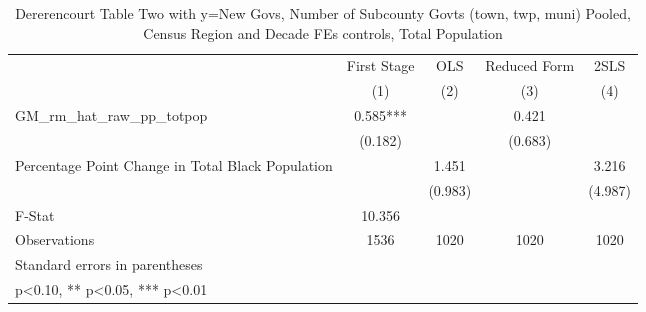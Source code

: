 \begin{table}[htbp]\centering
\def\sym#1{\ifmmode^{#1}\else\(^{#1}\)\fi}
\caption{Dererencourt Table Two with y=New Govs, Number of Subcounty Govts (town, twp, muni)  Pooled, Census Region and Decade FEs controls, Total Population}
\begin{tabular}{l*{4}{c}}
\toprule
                    & First Stage   &         OLS   &Reduced Form   &        2SLS   \\
                    &\multicolumn{1}{c}{(1)}   &\multicolumn{1}{c}{(2)}   &\multicolumn{1}{c}{(3)}   &\multicolumn{1}{c}{(4)}   \\
\midrule
GM\_rm\_hat\_raw\_pp\_totpop&       0.585***&               &       0.421   &               \\
                    &     (0.182)   &               &     (0.683)   &               \\
\addlinespace
Percentage Point Change in Total Black Population&               &       1.451   &               &       3.216   \\
                    &               &     (0.983)   &               &     (4.987)   \\
\midrule
F-Stat              &      10.356   &               &               &               \\
Observations        &        1536   &        1020   &        1020   &        1020   \\
\bottomrule
\multicolumn{5}{l}{\footnotesize Standard errors in parentheses}\\
\multicolumn{5}{l}{\footnotesize * p<0.10, ** p<0.05, *** p<0.01}\\
\end{tabular}
\end{table}
